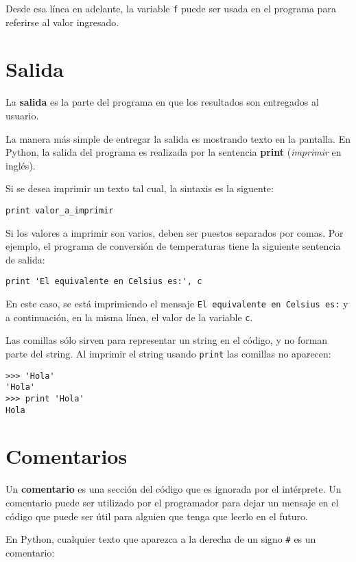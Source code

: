 Desde esa línea en adelante, la variable \lstinline!f! puede ser usada
en el programa para referirse al valor ingresado.

\section{Salida}

La \textbf{salida} es la parte del programa en que los resultados son
entregados al usuario.

La manera más simple de entregar la salida es mostrando texto en la
pantalla. En Python, la salida del programa es realizada por la
sentencia \textbf{print} (\emph{imprimir} en inglés).

Si se desea imprimir un texto tal cual, la sintaxis es la siguente:

\begin{lstlisting}
print valor_a_imprimir
\end{lstlisting}

Si los valores a imprimir son varios, deben ser puestos separados por
comas. Por ejemplo, el programa de conversión de temperaturas tiene la
siguiente sentencia de salida:

\begin{lstlisting}
print 'El equivalente en Celsius es:', c
\end{lstlisting}

En este caso, se está imprimiendo el mensaje
\texttt{El equivalente en Celsius es:} y a continuación, en la misma
línea, el valor de la variable \lstinline!c!.

Las comillas sólo sirven para representar un string en el código, y no
forman parte del string. Al imprimir el string usando \lstinline!print!
las comillas no aparecen:

\begin{lstlisting}
>>> 'Hola'
'Hola'
>>> print 'Hola'
Hola
\end{lstlisting}

\section{Comentarios}

Un \textbf{comentario} es una sección del código que es ignorada por el
intérprete. Un comentario puede ser utilizado por el programador para
dejar un mensaje en el código que puede ser útil para alguien que tenga
que leerlo en el futuro.

En Python, cualquier texto que aparezca a la derecha de un signo
\lstinline!#! es un comentario:

